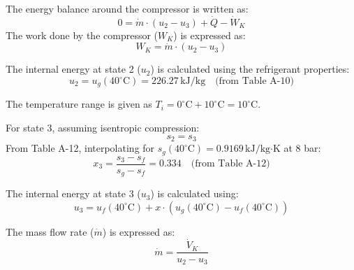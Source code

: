 The energy balance around the compressor is written as:  
\[
0 = \dot{m} \cdot (u_2 - u_3) + \dot{Q} - \dot{W}_K
\]  
The work done by the compressor (\(W_K\)) is expressed as:  
\[
W_K = \dot{m} \cdot (u_2 - u_3)
\]  

The internal energy at state 2 (\(u_2\)) is calculated using the refrigerant properties:  
\[
u_2 = u_g(40^\circ\text{C}) = 226.27 \, \text{kJ/kg} \quad \text{(from Table A-10)}
\]  

The temperature range is given as \(T_i = 0^\circ\text{C} + 10^\circ\text{C} = 10^\circ\text{C}\).  

For state 3, assuming isentropic compression:  
\[
s_2 = s_3
\]  
From Table A-12, interpolating for \(s_g(40^\circ\text{C}) = 0.9169 \, \text{kJ/kg·K}\) at 8 bar:  
\[
x_3 = \frac{s_3 - s_f}{s_g - s_f} = 0.334 \quad \text{(from Table A-12)}
\]  

The internal energy at state 3 (\(u_3\)) is calculated using:  
\[
u_3 = u_f(40^\circ\text{C}) + x \cdot (u_g(40^\circ\text{C}) - u_f(40^\circ\text{C}))
\]  

The mass flow rate (\(\dot{m}\)) is expressed as:  
\[
\dot{m} = \frac{\dot{V}_K}{u_2 - u_3}
\]